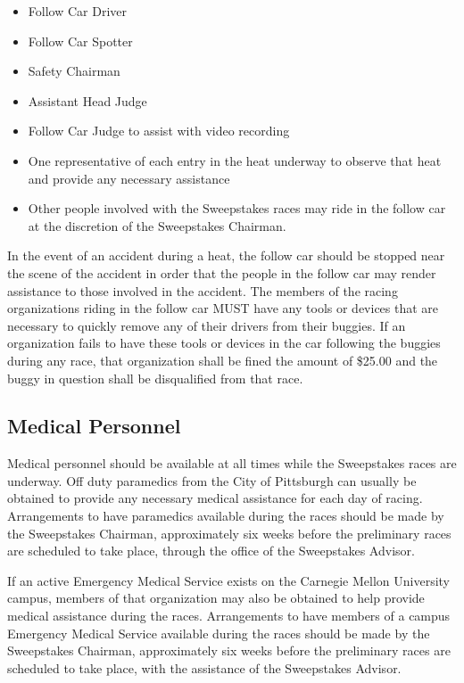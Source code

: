 	\begin{itemize}

		\item Follow Car Driver

		\item Follow Car Spotter

		\item Safety Chairman

		\item Assistant Head Judge

		\item Follow Car Judge to assist with video recording

		\item One representative of each entry in the heat underway to observe that heat and provide any necessary assistance

		\item Other people involved with the Sweepstakes races may ride in the follow car at the discretion of the Sweepstakes Chairman.

	\end{itemize}

	In the event of an accident during a heat, the follow car should be stopped near the scene of the accident in order that the people in the follow car may render assistance to those involved in the accident. The members of the racing organizations riding in the follow car MUST have any tools or devices that are necessary to quickly remove any of their drivers from their buggies. If an organization fails to have these tools or devices in the car following the buggies during any race, that organization shall be fined the amount of \$25.00 and the buggy in question shall be disqualified from that race. 

\subsection{Medical Personnel}

	Medical personnel should be available at all times while the Sweepstakes races are underway. Off duty paramedics from the City of Pittsburgh can usually be obtained to provide any necessary medical assistance for each day of racing. Arrangements to have paramedics available during the races should be made by the Sweepstakes Chairman, approximately six weeks before the preliminary races are scheduled to take place, through the office of the Sweepstakes Advisor.

	If an active Emergency Medical Service exists on the Carnegie Mellon University campus, members of that organization may also be obtained to help provide medical assistance during the races. Arrangements to have members of a campus Emergency Medical Service available during the races should be made by the Sweepstakes Chairman, approximately six weeks before the preliminary races are scheduled to take place, with the assistance of the Sweepstakes Advisor.

